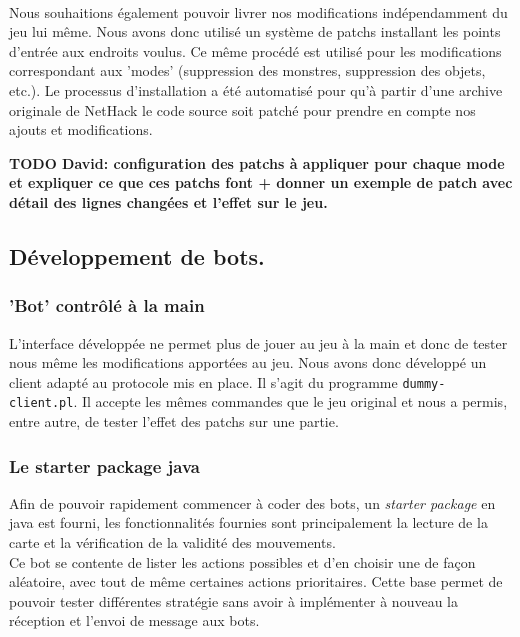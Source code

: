 \documentclass[a4paper,12pt]{article}
\begin{document}
\paragraph{} Nous souhaitions également pouvoir livrer nos modifications indépendamment du jeu lui même. Nous avons donc utilisé un système de patchs installant les points d'entrée aux endroits voulus. Ce même procédé est utilisé pour les modifications correspondant aux 'modes' (suppression des monstres, suppression des objets, etc.). Le processus d'installation a été automatisé pour qu'à partir d'une archive originale de NetHack le code source soit patché pour prendre en compte nos ajouts et modifications.

\textbf{
TODO David: configuration des patchs à appliquer pour chaque mode et expliquer ce que ces patchs font + donner un exemple de patch avec détail des lignes changées et l'effet sur le jeu.}


\subsection{Développement de bots.}

\subsubsection{'Bot' contrôlé à la main}

L'interface développée ne permet plus de jouer au jeu à la main et donc de tester nous même les modifications apportées au jeu. Nous avons donc développé un client adapté au protocole mis en place. Il s'agit du programme \verb!dummy-client.pl!. Il accepte les mêmes commandes que le jeu original et nous a permis, entre autre, de tester l'effet des patchs sur une partie.


\subsubsection{Le starter package java}
Afin de pouvoir rapidement commencer à coder des bots, un \emph{starter package}
en java est fourni, les fonctionnalités fournies sont principalement la lecture
de la carte et la vérification de la validité des mouvements.
\\
Ce bot se contente de lister les actions possibles et d'en choisir une de façon
aléatoire, avec tout de même certaines actions prioritaires. Cette base permet
de pouvoir tester différentes stratégie sans avoir à implémenter à nouveau la
réception et l'envoi de message aux bots.
\end{document}
